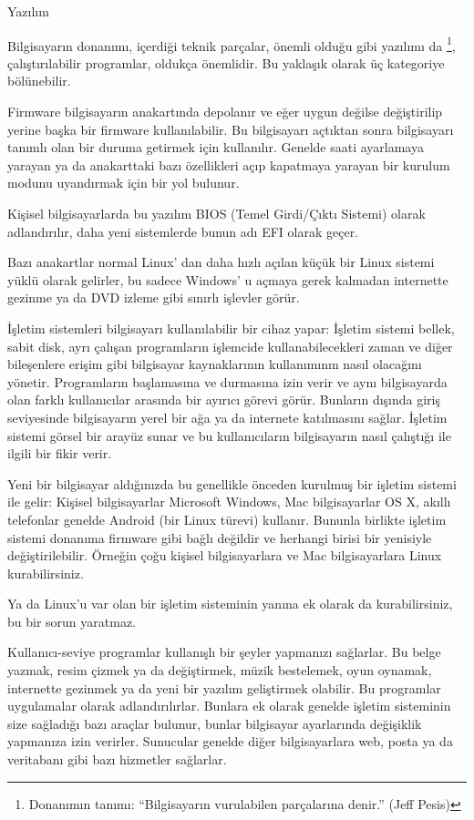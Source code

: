 \documentclass[10pt,a5paper]{book}
\begin{document}
\begin{section}{Yazılım}

Bilgisayarın donanımı, içerdiği teknik parçalar, önemli olduğu gibi yazılımı da
\footnote{Donanımın tanımı: “Bilgisayarın vurulabilen parçalarına denir.” (Jeff Pesis)}, çalıştırılabilir programlar, oldukça önemlidir. Bu yaklaşık olarak üç kategoriye bölünebilir.

Firmware bilgisayarın anakartında depolanır ve eğer uygun değilse değiştirilip yerine başka bir firmware kullanılabilir. Bu bilgisayarı açtıktan sonra bilgisayarı tanımlı olan bir duruma getirmek için kullanılır. Genelde saati ayarlamaya yarayan ya da anakarttaki bazı özellikleri açıp kapatmaya yarayan bir kurulum modunu uyandırmak için bir yol bulunur.

Kişisel bilgisayarlarda bu yazılım BIOS (Temel Girdi/Çıktı Sistemi) olarak adlandırılır, daha yeni sistemlerde bunun adı EFI olarak geçer.

Bazı anakartlar normal Linux' dan daha hızlı açılan küçük bir Linux sistemi yüklü olarak gelirler, bu sadece Windows' u açmaya gerek kalmadan internette gezinme ya da DVD izleme gibi sınırlı işlevler görür.

İşletim sistemleri bilgisayarı kullanılabilir bir cihaz yapar: İşletim sistemi bellek, sabit disk, ayrı çalışan programların işlemcide kullanabilecekleri zaman ve diğer bileşenlere erişim gibi bilgisayar kaynaklarının kullanımının nasıl olacağını yönetir. Programların başlamasına ve durmasına izin verir ve aynı bilgisayarda olan farklı kullanıcılar arasında bir ayırıcı görevi görür. Bunların dışında giriş seviyesinde bilgisayarın yerel bir ağa ya da internete katılmasını sağlar. İşletim sistemi görsel bir arayüz sunar ve bu kullanıcıların bilgisayarın nasıl çalıştığı ile ilgili bir fikir verir.

Yeni bir bilgisayar aldığınızda bu genellikle önceden kurulmuş bir işletim sistemi ile gelir: Kişisel bilgisayarlar Microsoft Windows, Mac bilgisayarlar OS X, akıllı telefonlar genelde Android (bir Linux türevi) kullanır. Bununla birlikte işletim sistemi donanıma firmware gibi bağlı değildir ve herhangi birisi bir yenisiyle değiştirilebilir. Örneğin çoğu kişisel bilgisayarlara ve Mac bilgisayarlara Linux kurabilirsiniz.

Ya da Linux'u var olan bir işletim sisteminin yanına ek olarak da kurabilirsiniz, bu bir sorun yaratmaz.

Kullanıcı-seviye programlar kullanışlı bir şeyler yapmanızı sağlarlar. Bu belge yazmak, resim çizmek ya da değiştirmek, müzik bestelemek, oyun oynamak, internette gezinmek ya da yeni bir yazılım geliştirmek olabilir. Bu programlar uygulamalar olarak adlandırılırlar. Bunlara ek olarak genelde işletim sisteminin size sağladığı bazı araçlar bulunur, bunlar bilgisayar ayarlarında değişiklik yapmanıza izin verirler. Sunucular genelde diğer bilgisayarlara web, posta ya da veritabanı gibi bazı hizmetler sağlarlar.
\end{section}
\end{document}
